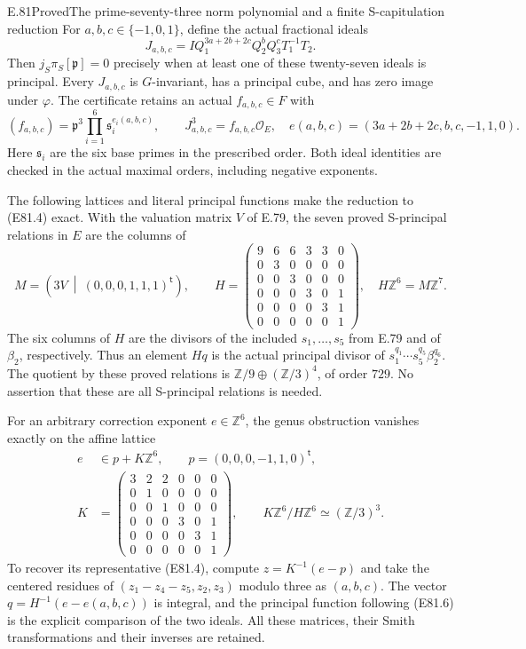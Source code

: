 \begin{statement}{E.81}{Proved}{The prime-seventy-three norm polynomial and a finite S-capitulation reduction}
For $a,b,c\in\{-1,0,1\}$, define the actual fractional ideals
\[
 J_{a,b,c}=
 I Q_1^{3a+2b+2c}Q_2^bQ_3^cT_1^{-1}T_2.
 \tag{E81.4}
\]
Then $j_S\pi_S[\mathfrak p]=0$ precisely when at least one of
these twenty-seven ideals is principal. Every $J_{a,b,c}$ is
$G$-invariant, has a principal cube, and has zero image under
$\varphi$. The certificate retains an actual $f_{a,b,c}\in F$
with
\[
 (f_{a,b,c})=
 \mathfrak p^3\prod_{i=1}^6\mathfrak s_i^{e_i(a,b,c)},
 \qquad J_{a,b,c}^{3}=f_{a,b,c}\mathcal O_E,
 \quad e(a,b,c)=(3a+2b+2c,b,c,-1,1,0).
 \tag{E81.5}
\]
Here $\mathfrak s_i$ are the six base primes in the prescribed
order. Both ideal identities are checked in the actual maximal
orders, including negative exponents.

The following lattices and literal principal functions make
the reduction to (E81.4) exact. With the valuation matrix $V$
of E.79, the seven proved S-principal relations in $E$ are
the columns of
\[
 M=\left(3V\ \middle|\ (0,0,0,1,1,1)^{\mathsf t}\right),
 \qquad
 H=\begin{pmatrix}
 9&6&6&3&3&0\\0&3&0&0&0&0\\0&0&3&0&0&0\\
 0&0&0&3&0&1\\0&0&0&0&3&1\\0&0&0&0&0&1
 \end{pmatrix},
 \quad H\mathbb Z^6=M\mathbb Z^7.
 \tag{E81.6}
\]
The six columns of $H$ are the divisors of the included
$s_1,\ldots,s_5$ from E.79 and of $\beta_2$, respectively.
Thus an element $Hq$ is the actual principal divisor of
$s_1^{q_1}\cdots s_5^{q_5}\beta_2^{q_6}$.
The quotient by these proved relations is
$\mathbb Z/9\oplus(\mathbb Z/3)^4$, of order $729$.
No assertion that these are all S-principal relations is
needed.

For an arbitrary correction exponent $e\in\mathbb Z^6$,
the genus obstruction vanishes exactly on the affine lattice
\[
 \begin{split}
 e&\in p+K\mathbb Z^6,\qquad p=(0,0,0,-1,1,0)^{\mathsf t},\\
 K&=\begin{pmatrix}
 3&2&2&0&0&0\\0&1&0&0&0&0\\0&0&1&0&0&0\\
 0&0&0&3&0&1\\0&0&0&0&3&1\\0&0&0&0&0&1
 \end{pmatrix},\qquad
 K\mathbb Z^6/H\mathbb Z^6\simeq(\mathbb Z/3)^3.
 \end{split}
 \tag{E81.7}
\]
To recover its representative (E81.4), compute
$z=K^{-1}(e-p)$ and take the centered residues of
$(z_1-z_4-z_5,z_2,z_3)$ modulo three as $(a,b,c)$.
The vector $q=H^{-1}(e-e(a,b,c))$ is integral, and the
principal function following (E81.6) is the explicit
comparison of the two ideals. All these matrices, their
Smith transformations and their inverses are retained.


\end{statement}
